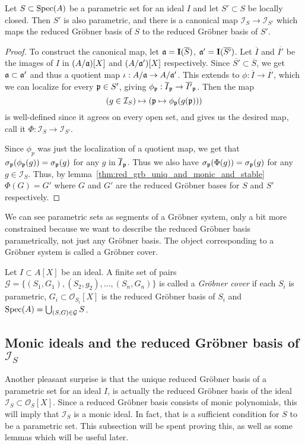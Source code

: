 \begin{proposition}\label{prop:subs_of_para_is_para}
  Let $S \subset \operatorname{Spec}(A)$ be a parametric set for an ideal $I$ and let $S' \subset S$ be locally closed. Then $S'$ is also parametric, and there is a canonical map $\mathcal I_{S} \to \mathcal I_{S'}$ which maps the reduced Gröbner basis of $S$ to the reduced Gröbner basis of $S'$.
\end{proposition}
\begin{proof}
  To construct the canonical map, let $\mathfrak{a} = \operatorname{\mathbf I}(\overline S)$, $\mathfrak{a}' = \operatorname{\mathbf I}(\overline{S'})$. Let $\overline I$ and $\overline{I'}$ be the images of $I$ in $(A/\mathfrak{a})[X]$ and $(A/\mathfrak{a}')[X]$ respectively. Since $\overline{S'} \subset \overline{S}$, we get $\mathfrak{a} \subset \mathfrak{a}'$ and thus a quotient map $\iota : A/\mathfrak{a} \to A/\mathfrak{a}'$. This extends to $\phi : \overline I \to \overline{I'}$, which we can localize for every $\mathfrak p \in S'$, giving $\phi_{\mathfrak p} : \overline I_{\mathfrak p} \to \overline{I'}_{\mathfrak p}$. Then the map
  \[(g \in \mathcal I_{S}) \mapsto (\mathfrak p \mapsto \phi_{\mathfrak p}(g(\mathfrak p)))\]
  is well-defined since it agrees on every open set, and gives us the desired map, call it $\Phi : \mathcal I_{S} \to \mathcal I_{S'}$.

  Since $\phi_{p}$ was just the localization of a quotient map, we get that $\sigma_{\mathfrak p}(\phi_{\mathfrak p}(g)) = \sigma_{\mathfrak p}(g)$ for any $g$ in $\overline I_{\mathfrak p}$. Thus we also have $\sigma_{\mathfrak p}(\Phi(g)) = \sigma_{\mathfrak p}(g)$ for any $g \in \mathcal I_{S}$. Thus, by lemma~\ref{thm:red_grb_uniq_and_monic_and_stable} $\Phi(G) = G'$ where $G$ and $G'$ are the reduced Gröbner bases for $S$ and $S'$ respectively.
\end{proof}

We can see parametric sets as segments of a Gröbner system, only a bit more constrained because we want to describe the reduced Gröbner basis parametrically, not just any Gröbner basis. The object corresponding to a Gröbner system is called a Gröbner cover.

\begin{definition}\label{def:grb_cover}
  Let $I \subset A[X]$ be an ideal. A finite set of pairs $\mathcal G = \{(S_{1}, G_{1}), (S_{2}, g_{2}), \dots, (S_{n}, G_{n})\}$ is called a \textit{Gröbner cover} if each $S_{i}$ is parametric, $G_{i} \subset \mathcal O_{S_{i}}[X]$ is the reduced Gröbner basis of $S_{i}$ and $\operatorname{Spec}(A) = \bigcup_{(S, G) \in \mathcal G} S$.
\end{definition}


\subsection{Monic ideals and the reduced Gröbner basis of $\mathcal I_{S}$}
Another pleasant surprise is that the unique reduced Gröbner basis of a parametric set for an ideal $I$, is actually the reduced Gröbner basis of the ideal $\mathcal I_{S} \subset \mathcal O_{S}[X]$. Since a reduced Gröbner basis consists of monic polynomials, this will imply that $\mathcal I_{S}$ is a monic ideal. In fact, that is a sufficient condition for $S$ to be a parametric set. This subsection will be spent proving this, as well as some lemmas which will be useful later.

